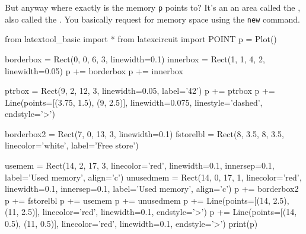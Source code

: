 But anyway where exactly is the memory \texttt{p} points to? It's an an area called the , also called the . You basically request for memory space using the \texttt{new} command.
\begin{python}
from latextool_basic import *
from latexcircuit import POINT
p = Plot()

borderbox = Rect(0, 0, 6, 3, linewidth=0.1)
innerbox = Rect(1, 1, 4, 2, linewidth=0.05)
p += borderbox
p += innerbox

ptrbox = Rect(9, 2, 12, 3, linewidth=0.05, label='42')
p += ptrbox
p += Line(points=[(3.75, 1.5), (9, 2.5)], linewidth=0.075, linestyle='dashed', endstyle='>')

borderbox2 = Rect(7, 0, 13, 3, linewidth=0.1)
fstorelbl = Rect(8, 3.5, 8, 3.5, linecolor='white', label='Free store')

usemem = Rect(14, 2, 17, 3, linecolor='red', linewidth=0.1, innersep=0.1, label='Used memory', align='c')
unusedmem = Rect(14, 0, 17, 1, linecolor='red', linewidth=0.1, innersep=0.1, label='Used memory', align='c')
p += borderbox2
p += fstorelbl
p += usemem
p += unusedmem
p += Line(points=[(14, 2.5), (11, 2.5)], linecolor='red', linewidth=0.1, endstyle='>')
p += Line(points=[(14, 0.5), (11, 0.5)], linecolor='red', linewidth=0.1, endstyle='>')
print(p)
\end{python}


